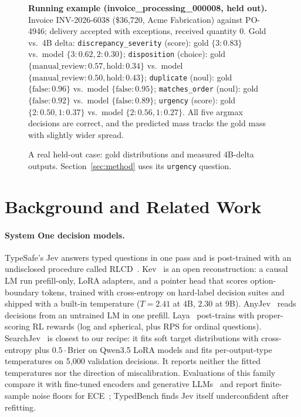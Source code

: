 \documentclass{article}
\begin{document}
\begin{figure}[t]
\centering
\begin{minipage}{0.92\linewidth}\small
\textbf{Running example (invoice\_processing\_000008, held out).} Invoice
INV-2026-6038 (\$36,720, Acme Fabrication) against PO-4946; delivery
accepted with exceptions, received quantity 0. Gold vs.\ 4B delta:
\texttt{discrepancy\_severity} (score): gold $\{3{:}0.83\}$ vs.\ model
$\{3{:}0.62, 2{:}0.30\}$; \texttt{disposition} (choice): gold
$\{\text{manual\_review}{:}0.57, \text{hold}{:}0.34\}$ vs.\ model
$\{\text{manual\_review}{:}0.50, \text{hold}{:}0.43\}$;
\texttt{duplicate} (noul): gold $\{\text{false}{:}0.96\}$ vs.\ model
$\{\text{false}{:}0.95\}$; \texttt{matches\_order} (noul): gold
$\{\text{false}{:}0.92\}$ vs.\ model $\{\text{false}{:}0.89\}$;
\texttt{urgency} (score): gold $\{2{:}0.50, 1{:}0.37\}$ vs.\ model
$\{2{:}0.56, 1{:}0.27\}$. All five argmax decisions are correct, and the
predicted mass tracks the gold mass with slightly wider spread.
\end{minipage}
\caption{A real held-out case: gold distributions and measured 4B-delta
outputs. Section~\ref{sec:method} uses its \texttt{urgency} question.}
\label{fig:running}
\end{figure}

\section{Background and Related Work}

\paragraph{System One decision models.} TypeSafe's Jev answers typed
questions in one pass and is post-trained with an undisclosed procedure
called RLCD~\cite{typesafe2026rlcd}. Kev~\cite{kev2026} is an open
reconstruction: a causal LM run prefill-only, LoRA adapters, and a pointer
head that scores option-boundary tokens, trained with cross-entropy on
hard-label decision suites and shipped with a built-in temperature ($T=2.41$
at 4B, $2.30$ at 9B). AnyJev~\cite{zhang2026anyjev} reads decisions from an
untrained LM in one prefill. Laya~\cite{laya2026} post-trains with
proper-scoring RL rewards (log and spherical, plus RPS for ordinal
questions). SearchJev~\cite{cao2026searchjev} is closest to our recipe: it
fits soft target distributions with cross-entropy plus $0.5\cdot$Brier on
Qwen3.5 LoRA models and fits per-output-type temperatures on 5,000
validation decisions. It reports neither the fitted temperatures nor the
direction of miscalibration. Evaluations of this family compare it with
fine-tuned encoders and generative LLMs~\cite{rafe2026benchmarking} and
report finite-sample noise floors for ECE~\cite{sharma2026typedbench};
TypedBench finds Jev itself underconfident after refitting.
\end{document}

